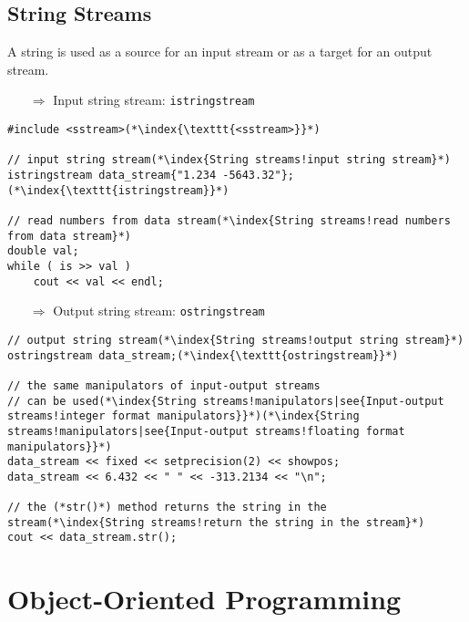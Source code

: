 \documentclass[10pt]{book}
\begin{document}
\section{String Streams}
A string is used as a source for an input stream or as a target for an output stream. \\
\begin{enumerate}
\item[$\Rightarrow$] Input string stream: \texttt{istringstream}
\end{enumerate}
\begin{lstlisting}
#include <sstream>(*\index{\texttt{<sstream>}}*)

// input string stream(*\index{String streams!input string stream}*)
istringstream data_stream{"1.234 -5643.32"};(*\index{\texttt{istringstream}}*)

// read numbers from data stream(*\index{String streams!read numbers from data stream}*)
double val;
while ( is >> val )
    cout << val << endl;
\end{lstlisting}
\begin{enumerate}
\item[$\Rightarrow$] Output string stream: \texttt{ostringstream}
\end{enumerate}
\begin{lstlisting}
// output string stream(*\index{String streams!output string stream}*)
ostringstream data_stream;(*\index{\texttt{ostringstream}}*)

// the same manipulators of input-output streams
// can be used(*\index{String streams!manipulators|see{Input-output streams!integer format manipulators}}*)(*\index{String streams!manipulators|see{Input-output streams!floating format manipulators}}*)
data_stream << fixed << setprecision(2) << showpos;
data_stream << 6.432 << " " << -313.2134 << "\n";

// the (*str()*) method returns the string in the stream(*\index{String streams!return the string in the stream}*)
cout << data_stream.str();
\end{lstlisting}
%
%
\chapter{Object-Oriented Programming}
%
%
\end{document}
